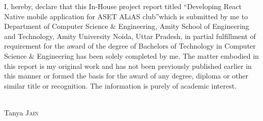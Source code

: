 \begin{declaration}
I, hereby, declare that this In-House project report
titled \textquotedblleft Developing React Native mobile application for ASET ALiAS club\textquotedblright which is submitted by me to Department of Computer Science \& Engineering, Amity School of Engineering and Technology, Amity University Noida, Uttar Pradesh, in partial fulfillment of requirement for the award of the degree of Bachelors of Technology in Computer Science \& Engineering has been solely completed by me. The matter embodied in this report is my original work and has not been previously published earlier in this manner or formed the basis for the award of any degree, diploma or other similar title or recognition. The information is purely of academic interest.

\begin{flushright}
  \textsc{}\\[1.0cm]
  Tanya \textsc{Jain}
\end{flushright}

\end{declaration}
